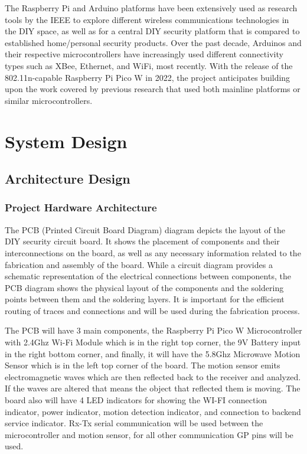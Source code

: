 \documentclass[conference]{IEEEtran}
\begin{document}
The Raspberry Pi and Arduino platforms have been extensively used as research tools
by the IEEE to explore different wireless communications technologies in the DIY
space, as well as for a central DIY security platform that is compared to established
home/personal security products.\cite{sarhan2020} Over the past decade, Arduinos and their
respective microcontrollers have increasingly used different connectivity types
such as XBee, Ethernet, and WiFi, most recently.\cite{sarhan2020} With the release of the
802.11n-capable Raspberry Pi Pico W in 2022, the project anticipates building
upon the work covered by previous research that used both mainline platforms or
similar microcontrollers.

\section{System Design}

\subsection{Architecture Design}

\subsubsection{Project Hardware Architecture}


The PCB (Printed Circuit Board Diagram) diagram depicts the layout of the DIY security
circuit board. It shows the placement of components and their interconnections on the
board, as well as any necessary information related to the fabrication and assembly of
the board. While a circuit diagram provides a schematic representation of the electrical
connections between components, the PCB diagram shows the physical layout of the
components and the soldering points between them and the soldering layers. It is
important for the efficient routing of traces and connections and will be used during
the fabrication process.

The PCB will have 3 main components, the Raspberry Pi Pico W Microcontroller with
2.4Ghz Wi-Fi Module which is in the right top corner, the 9V Battery input in the
right bottom corner, and finally, it will have the 5.8Ghz Microwave Motion Sensor
which is in the left top corner of the board. The motion sensor emits electromagnetic
waves which are then reflected back to the receiver and analyzed. If the waves are
altered that means the object that reflected them is moving. The board also will have
4 LED indicators for showing the WI-FI connection indicator, power indicator,
motion detection indicator, and connection to backend service indicator.
Rx-Tx serial communication will be used between the microcontroller and motion sensor,
for all other communication GP pins will be used.
\end{document}
